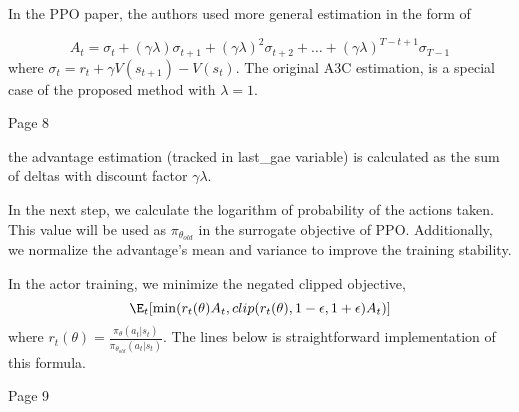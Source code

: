 In the PPO paper, the authors used more general estimation in the form of

\begin{equation*}
  A_t= \sigma_t+(\gamma\lambda)\sigma_{t+1}+(\gamma\lambda)^2\sigma_{t+2}+\ldots+(\gamma\lambda)^{T-t+1}\sigma_{T-1}
\end{equation*}
where \begin{math}\sigma_t=r_t+\gamma V(s_{t+1})-V(s_t)\end{math}. The original
A3C estimation, is a special case of the proposed method with \begin{math}\lambda=1\end{math}.

Page 8

the advantage estimation (tracked in last\_gae variable) is calculated as the sum of deltas with discount
factor \begin{math}\gamma\lambda\end{math}.

In the next step, we calculate the logarithm of probability of the actions taken. This value will be used as
\begin{math}\pi_{\theta_{old}}\end{math} in the surrogate objective of PPO. Additionally, we normalize the advantage’s
mean and variance to improve the training stability.

In the actor training, we minimize the negated clipped objective,
\begin{equation*}
\E_t[\min(r_t(\theta)A_t,clip(r_t(\theta), 1-\epsilon, 1+\epsilon)A_t)]
\end{equation*}
where
\begin{math}r_t(\theta)=\frac{\pi_\theta(a_t|s_t)}{\pi_{\theta_{old}}(a_t|s_t)}\end{math}.
The lines below is straightforward implementation of this formula.

Page 9

